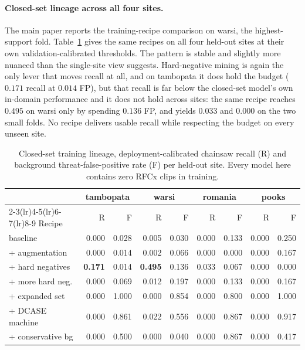 \documentclass[letterpaper]{article}
\begin{document}
\paragraph{Closed-set lineage across all four sites.} The main paper reports the
training-recipe comparison on warsi, the highest-support fold.
Table~\ref{tab:supp-ladder} gives the same recipes on all four held-out sites at
their own validation-calibrated thresholds. The pattern is stable and slightly more nuanced than the single-site view
suggests. Hard-negative mining is again the only lever that moves recall at all,
and on tambopata it does hold the budget ($0.171$ recall at $0.014$ FP), but that
recall is far below the closed-set model's own in-domain performance and it does
not hold across sites: the same recipe reaches $0.495$ on warsi only by spending
$0.136$ FP, and yields $0.033$ and $0.000$ on the two small folds. No recipe
delivers usable recall while respecting the budget on every unseen site.

\begin{table}[t]
\centering
\caption{Closed-set training lineage, deployment-calibrated chainsaw recall
(R) and background threat-false-positive rate (F) per held-out site. Every model
here contains zero RFCx clips in training.}
\label{tab:supp-ladder}
\small\setlength{\tabcolsep}{3pt}
\begin{tabular}{lrrrrrrrr}
\toprule
& \multicolumn{2}{c}{tambopata} & \multicolumn{2}{c}{warsi}
& \multicolumn{2}{c}{romania} & \multicolumn{2}{c}{pooks} \\
\cmidrule(lr){2-3}\cmidrule(lr){4-5}\cmidrule(lr){6-7}\cmidrule(lr){8-9}
Recipe & R & F & R & F & R & F & R & F \\
\midrule
baseline           & 0.000 & 0.028 & 0.005 & 0.030 & 0.000 & 0.133 & 0.000 & 0.250 \\
+ augmentation     & 0.000 & 0.014 & 0.002 & 0.066 & 0.000 & 0.000 & 0.000 & 0.167 \\
+ hard negatives   & \textbf{0.171} & 0.014 & \textbf{0.495} & 0.136 & 0.033 & 0.067 & 0.000 & 0.000 \\
+ more hard neg.   & 0.000 & 0.069 & 0.012 & 0.197 & 0.000 & 0.133 & 0.000 & 0.167 \\
+ expanded set     & 0.000 & 1.000 & 0.000 & 0.854 & 0.000 & 0.800 & 0.000 & 1.000 \\
+ DCASE machine    & 0.000 & 0.861 & 0.022 & 0.556 & 0.000 & 0.867 & 0.000 & 0.917 \\
+ conservative bg  & 0.000 & 0.500 & 0.000 & 0.040 & 0.000 & 0.867 & 0.000 & 0.417 \\
\bottomrule
\end{tabular}
\end{table}
\end{document}
